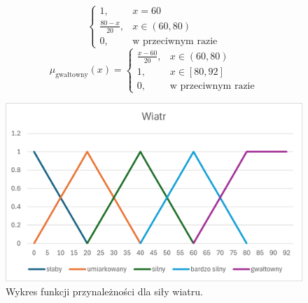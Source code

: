 \documentclass{article}
\begin{document}
\begin{enumerate}
\begin{equation}
\begin{cases}
                    1, & x = 60 \\
                    \frac{80 - x}{20}, & x \in (60, 80) \\
                    0, & \text{w przeciwnym razie}
                    \end{cases}
              \end{equation}
              \begin{equation}
                    \mu_{\text{gwałtowny}}(x) =
                    \begin{cases}
                    \frac{x - 60}{20}, & x \in (60, 80) \\
                    1, & x \in [80, 92] \\
                    0, & \text{w przeciwnym razie}
                    \end{cases}
              \end{equation}
        \begin{figure}[H]
    \centering
    \includegraphics[width=\textwidth]{img/wind.png}
    \caption{Wykres funkcji przynależności dla siły wiatru.}
    \end{figure}
              

\end{enumerate}
\end{document}
